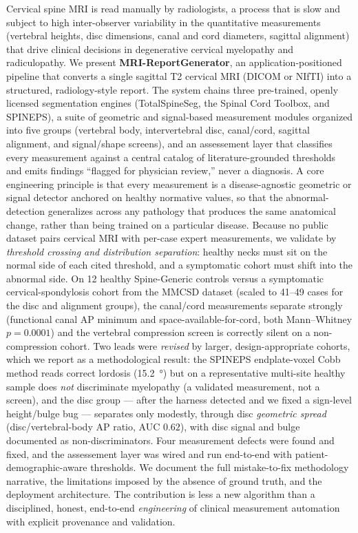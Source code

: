 Cervical spine MRI is read manually by radiologists, a process that is slow and subject to high
inter-observer variability in the quantitative measurements (vertebral heights, disc dimensions, canal
and cord diameters, sagittal alignment) that drive clinical decisions in degenerative cervical
myelopathy and radiculopathy. We present \textbf{MRI-ReportGenerator}, an application-positioned
pipeline that converts a single sagittal T2 cervical MRI (DICOM or NIfTI) into a structured,
radiology-style report. The system chains three pre-trained, openly licensed segmentation engines
(TotalSpineSeg, the Spinal Cord Toolbox, and SPINEPS), a suite of geometric and signal-based
measurement modules organized into five groups (vertebral body, intervertebral disc, canal/cord,
sagittal alignment, and signal/shape screens), and an assessement layer that classifies every
measurement against a central catalog of literature-grounded thresholds and emits findings ``flagged
for physician review,'' never a diagnosis. A core engineering principle is that every measurement is a
disease-agnostic geometric or signal detector anchored on healthy normative values, so that the
abnormal-detection generalizes across any pathology that produces the same anatomical change, rather
than being trained on a particular disease. Because no public dataset pairs cervical MRI with per-case
expert measurements, we validate by \emph{threshold crossing and distribution separation}: healthy
necks must sit on the normal side of each cited threshold, and a symptomatic cohort must shift into the
abnormal side. On 12 healthy Spine-Generic controls versus a symptomatic cervical-spondylosis cohort
from the MMCSD dataset (scaled to 41--49 cases for the disc and alignment groups), the canal/cord
measurements separate strongly (functional canal AP minimum and space-available-for-cord, both
Mann--Whitney $p=0.0001$) and the vertebral compression screen is correctly silent on a non-compression
cohort. Two leads were \emph{revised} by larger, design-appropriate cohorts, which we report as a
methodological result: the SPINEPS endplate-voxel Cobb method reads correct lordosis (\SI{+15.2}{\degree})
but on a representative multi-site healthy sample does \emph{not} discriminate myelopathy (a validated
measurement, not a screen), and the disc group --- after the harness detected and we fixed a sign-level
height/bulge bug --- separates only modestly, through disc \emph{geometric spread} (disc/vertebral-body AP
ratio, AUC $0.62$), with disc signal and bulge documented as non-discriminators. Four measurement defects
were found and fixed, and the assessement layer was wired and run end-to-end with
patient-demographic-aware thresholds. We document the full
mistake-to-fix methodology narrative, the limitations imposed by the absence of ground truth, and the
deployment architecture. The contribution is less a new algorithm than a disciplined, honest,
end-to-end \emph{engineering} of clinical measurement automation with explicit provenance and validation.
